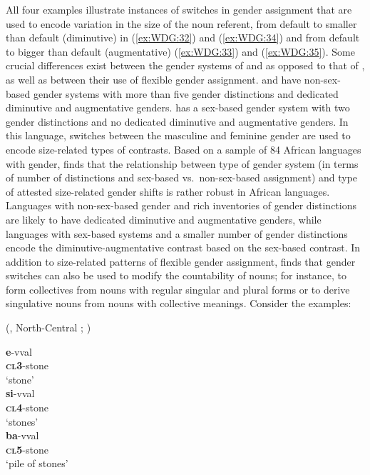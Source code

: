 \documentclass[output=collectionpaper]{langsci/langscibook}
\begin{document}
All four examples illustrate instances of switches in gender assignment that are used to encode variation in the size of the noun referent, from default to smaller than default (diminutive) in (\ref{ex:WDG:32}) and (\ref{ex:WDG:34}) and from default to bigger than default (augmentative) (\ref{ex:WDG:33}) and (\ref{ex:WDG:35}). Some crucial differences exist between the gender systems of  and  as opposed to that of , as well as between their use of flexible gender assignment.  and  have non-sex-based gender systems with more than five gender distinctions and dedicated diminutive and augmentative genders.  has a sex-based gender system with two gender distinctions and no dedicated diminutive and augmentative genders. In this language, switches between the masculine and feminine gender are used to encode size-related types of contrasts. Based on a sample of 84 African languages with gender, \cite{DiGarbo2014} finds that the relationship between type of gender system (in terms of number of distinctions and sex-based vs.\ non-sex-based assignment) and type of attested size-related gender shifts is rather robust in African languages. Languages with non-sex-based gender and rich inventories of gender distinctions are likely to have dedicated diminutive and augmentative genders, while languages with sex-based systems and a smaller number of gender distinctions encode the diminutive-augmentative contrast based on the sex-based contrast. In addition to size-related patterns of flexible gender assignment, \cite{DiGarbo2014} finds that gender switches can also be used to modify the countability of nouns; for instance, to form collectives from nouns with regular singular and plural forms or to derive singulative nouns from nouns with collective meanings. Consider the examples:

\ea\label{ex:WDG:36}
 (, North-Central ; \citealt[243]{Sagna2011}) \\
\begin{xlist}
\ex
\gll	\textbf{e}-vval \\
	\textbf{\textsc{cl}3}-stone \\
\glt	`stone' \\
\ex
\gll	\textbf{si}-vval \\
	\textbf{\textsc{cl}4}-stone \\
\glt	`stones'\\
\ex
\gll 	\textbf{ba}-vval \\
	\textbf{\textsc{cl}5}-stone \\
\glt	`pile of stones' \\
\end{xlist}
\z
\end{document}
